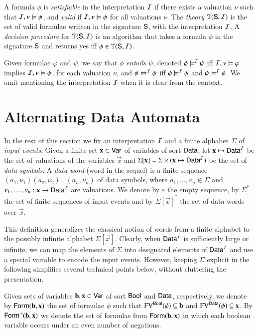 \documentclass[10pt]{llncs}
\begin{document}
A formula $\phi$ is \emph{satisfiable} in the interpretation $\mathcal{I}$ if
there exists a valuation $\nu$ such that $\mathcal{I},\nu \models \phi$, and
\emph{valid} if $\mathcal{I},\nu \models \phi$ for all valuations $\nu$.  The
\emph{theory} $\mathbb{T}(\mathsf{S},\mathcal{I})$ is the set of valid formulae written
in the signature $\mathsf{S}$, with the interpretation $\mathcal{I}$. A \emph{decision
procedure} for $\mathbb{T}(\mathsf{S},\mathcal{I})$ is an algorithm that takes a formula
$\phi$ in the signature $\mathsf{S}$ and returns yes iff $\phi \in
\mathbb{T}(\mathsf{S},\mathcal{I})$. 

Given formulae $\varphi$ and $\psi$, we say that \emph{$\phi$ entails
  $\psi$}, denoted $\phi \models^{\mathcal{I}} \psi$ iff $\mathcal{I},\nu \models \varphi$
implies $\mathcal{I},\nu \models \psi$, for each valuation $\nu$, and $\phi
\Leftrightarrow^{\mathcal{I}} \psi$ iff $\phi \models^{\mathcal{I}} \psi$ and $\psi \models^{\mathcal{I}} \phi$.
We omit mentioning the interpretation $\mathcal{I}$ when it is clear from the
context.

\section{Alternating Data Automata}

In the rest of this section we fix an interpretation $\mathcal{I}$ and a finite
alphabet $\Sigma$ of \emph{input events}. Given a finite set $\mathbf x
\subset \mathsf{Var}$ of variables of sort $\mathsf{Data}$, let $\mathbf x \mapsto
\mathsf{Data}^{\mathcal{I}}$ be the set of valuations of the variables $\vec{x}$ and
$\Sigma[\mathbf x] = \Sigma \times (\mathbf x \mapsto \mathsf{Data}^{\mathcal{I}})$ be the
set of \emph{data symbols}. A \emph{data word} (word in the sequel) is
a finite sequence $(a_1,\nu_1)(a_2,\nu_2) \ldots (a_n,\nu_n)$ of data
symbols, where $a_1,\ldots,a_n \in \Sigma$ and $\nu_1,\ldots,\nu_n :
\mathbf x \rightarrow \mathsf{Data}^{\mathcal{I}}$ are valuations. We denote by
$\varepsilon$ the empty sequence, by $\Sigma^*$ the set of finite
sequences of input events and by $\Sigma[\vec{x}]^*$ the set of data
words over $\vec{x}$.

This definition generalizes the classical notion of words from a
finite alphabet to the possibly infinite alphabet
$\Sigma[\vec{x}]$. Clearly, when $\mathsf{Data}^{\mathcal{I}}$ is sufficiently large or
infinite, we can map the elements of $\Sigma$ into designated elements
of $\mathsf{Data}^{\mathcal{I}}$ and use a special variable to encode the input
events. However, keeping $\Sigma$ explicit in the following simplifies
several technical points below, without cluttering the presentation.

Given sets of variables $\mathbf b,\mathbf x \subset \mathsf{Var}$ of sort
$\mathsf{Bool}$ and $\mathsf{Data}$, respectively, we denote by
$\mathsf{Form}(\mathbf b,\mathbf x)$ the set of formulae $\phi$ such that
$\mathrm{FV}^{\mathsf{Bool}}(\phi) \subseteq \mathbf b$ and $\mathrm{FV}^{\mathsf{Data}}(\phi) \subseteq
\mathbf x$. By $\mathsf{Form}^+(\mathbf b,\mathbf x)$ we denote the set of formulae
from $\mathsf{Form}(\mathbf b,\mathbf x)$ in which each boolean variable occurs
under an even number of negations.
\end{document}
